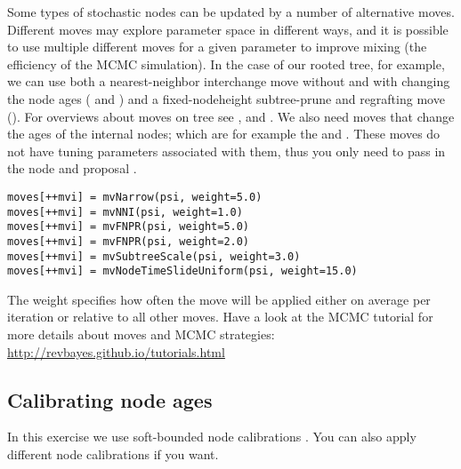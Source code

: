 Some types of stochastic nodes can be updated by a number of alternative moves. 
Different moves may explore parameter space in different ways, and it is possible to use multiple different moves for a given parameter to improve mixing (the efficiency of the MCMC simulation). 
In the case of our rooted tree, for example, we can use both a nearest-neighbor interchange move without and with changing the node ages ( and ) and a fixed-nodeheight subtree-prune and regrafting move (). 
For overviews about moves on tree see \cite{Lakner2008}, \cite{Hoehna2008} and \cite{Hoehna2012}.
We also need moves that change the ages of the internal nodes; which are for example the  and .
These moves do not have tuning parameters associated with them, thus you only need to pass in the  node and proposal . 
{\tt \begin{snugshade*}
\begin{lstlisting}
moves[++mvi] = mvNarrow(psi, weight=5.0)
moves[++mvi] = mvNNI(psi, weight=1.0)
moves[++mvi] = mvFNPR(psi, weight=5.0)
moves[++mvi] = mvFNPR(psi, weight=2.0)
moves[++mvi] = mvSubtreeScale(psi, weight=3.0)
moves[++mvi] = mvNodeTimeSlideUniform(psi, weight=15.0)
\end{lstlisting}
\end{snugshade*}}
The weight specifies how often the move will be applied either on average per iteration or relative to all other moves.
Have a look at the MCMC tutorial for more details about moves and MCMC strategies: \href{http://revbayes.github.io/tutorials.html}{http://revbayes.github.io/tutorials.html}

\subsection{Calibrating node ages}

In this exercise we use soft-bounded node calibrations \citep{Yang2006}.
You can also apply different node calibrations if you want.

